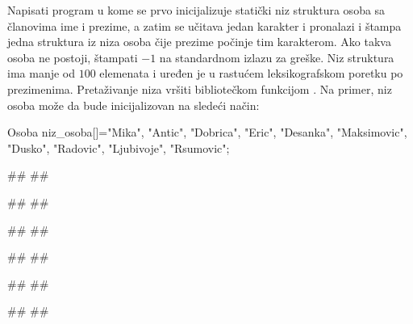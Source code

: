 \begin{Exercise}[label=3_30]
  Napisati program u kome se prvo inicijalizuje statički niz struktura
  osoba sa članovima ime i prezime, a zatim se učitava jedan
  karakter i pronalazi i štampa jedna struktura iz niza osoba čije prezime počinje tim
  karakterom. Ako takva osoba ne postoji, štampati $-1$ na standardnom
  izlazu za greške.
  Niz struktura ima manje od $100$ elemenata i uređen je u rastućem leksikografskom poretku po prezimenima.
  Pretaživanje niza vršiti bibliotečkom funkcijom .
Na primer, niz osoba može da bude inicijalizovan na sledeći način:
\begin{ckod}
Osoba niz_osoba[]={{"Mika", "Antic"},
                   {"Dobrica", "Eric"},
                   {"Desanka", "Maksimovic"},
                   {"Dusko", "Radovic"},
                   {"Ljubivoje", "Rsumovic"}};
\end{ckod}
  
  
\begin{minitest}
\begin{test}{1}
#\naslovUlaz#
##
  
#\naslovIzlaz#
##
\end{test}
\end{minitest}
\begin{minitest}
\begin{test}{2}
#\naslovUlaz#
##
  
#\naslovIzlaz#
##
\end{test}
\end{minitest}
\begin{minitest}
\begin{test}{3}
#\naslovUlaz#
##
  
#\naslovIzlaz#
##
\end{test}
\end{minitest}


\end{Exercise}




